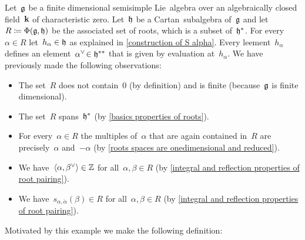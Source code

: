 \begin{example}[Motivation]
  Let~$\mathfrak{g}$ be a finite dimensional semisimple Lie~algebra over an algebraically closed field~$\mathbf{k}$ of characteristic zero.
  Let~$\mathfrak{h}$ be a Cartan~subalgebra of~$\mathfrak{g}$ and let~$R \coloneqq \Phi(\mathfrak{g}, \mathfrak{h})$ be the associated set of roots, which is a subset of~$\mathfrak{h}^*$.
  For every~$\alpha \in R$ let~$h_\alpha \in \mathfrak{h}$ as explained in \cref{construction of S alpha}.
  Every leement~$h_\alpha$ defines an element~$\check*{\alpha} \in \hlie^{**}$ that is given by evaluation at~$h_\alpha$.
  We have previously made the following observations:
  \begin{itemize}
    \item
      The set~$R$ does not contain~$0$ (by definition) and is finite (because~$\mathfrak{g}$ is finite dimensional).
    \item
      The set~$R$ spans~$\mathfrak{h}^*$ (by \cref{basics properties of roots}).
    \item
      For every~$\alpha \in R$ the multiples of~$\alpha$ that are again contained in~$R$ are precisely~$\alpha$ and~$-\alpha$ (by \cref{roots spaces are onedimensional and reduced}).
    \item
      We have~$\pair{\alpha, \check{\beta}} \in \Integer$ for all~$\alpha, \beta \in R$ (by \cref{integral and reflection properties of root pairing}).
    \item
      We have~$s_{\alpha, \check{\alpha}}(\beta) \in R$ for all~$\alpha, \beta \in R$ (by \cref{integral and reflection properties of root pairing}).
  \end{itemize}
  Motivated by this example we make the following definition:
\end{example}


